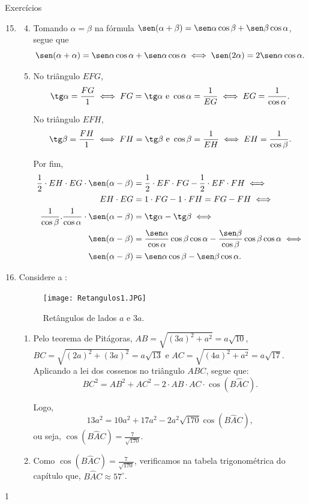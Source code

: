 \begin{answer}{Exercícios}
{\exerciselist
\begin{enumerate}[wide]\setcounter{enumi}{14}
\item 
\begin{enumerate}[wide]\setcounter{enumii}{3}
    \item{}
     Tomando $\alpha=\beta$ na fórmula $\sen(\alpha+\beta)=\sen\alpha\cos\beta+\sen\beta\cos\alpha$, segue que
     $$\sen(\alpha+\alpha)=\sen\alpha\cos\alpha+\sen\alpha\cos\alpha \iff \sen(2\alpha)=2\sen\alpha\cos\alpha.$$
     
     \item{}
     No triângulo $EFG$, 
     $$\tg\alpha=\frac{FG}{1} \iff FG=\tg\alpha \ \text{e} \ \cos\alpha=\frac{1}{EG} \iff EG=\frac{1}{\cos\alpha}.$$
     
     No triângulo $EFH$, 
     $$\tg\beta=\frac{FH}{1} \iff FH=\tg\beta \ \text{e} \ \cos\beta=\frac{1}{EH} \iff EH=\frac{1}{\cos\beta}.$$ 
     
     Por fim,
    \begin{align*}
     \frac{1}{2} \cdot EH \cdot EG \cdot \sen(\alpha-\beta)&=\frac{1}{2}\cdot EF\cdot FG-\frac{1}{2}\cdot EF\cdot FH \iff\\
     EH\cdot EG&=1\cdot FG-1\cdot FH=FG-FH  \iff\\
     \frac{1}{\cos\beta}.\frac{1}{\cos\alpha}\cdot\sen(\alpha-\beta)&=\tg\alpha-\tg\beta \iff\\
     \sen(\alpha-\beta)&=\frac{\sen\alpha}{\cos\alpha}\cos\beta\cos\alpha-\frac{\sen\beta}{\cos\beta}\cos\beta\cos\alpha\iff\\
     \sen(\alpha-\beta)&=\sen\alpha\cos\beta-\sen\beta\cos\alpha.
    \end{align*}
\end{enumerate}

\item Considere a :
     \begin{figure}[H]
    \centering
    \texttt{[image: Retangulos1.JPG]}
    \caption{Retângulos de lados $a$ e $3a$.}
    \label{retangulos1}
\end{figure}
\begin{enumerate}
    \item {}
     Pelo teorema de Pitágoras, $AB=\sqrt{(3a)^2+a^2}=a\sqrt{10}$, $BC=\sqrt{(2a)^2+(3a)^2}=a\sqrt{13}$ e $AC=\sqrt{(4a)^2+a^2}=a\sqrt{17}.$ Aplicando a lei dos cossenos no triângulo $ABC$, segue que:
    $$BC^2=AB^2+AC^2-2\cdot AB \cdot AC\cdot\cos(B\hat{A}C).$$
    
    Logo,  
    $$13a^2=10a^2+17a^2-2a^2\sqrt{170}\cos(B\hat{A}C),$$
    ou seja, $\cos(B\hat{A}C)=\frac{7}{\sqrt{170}}$.
    
    \item{}
    Como $\cos(B\hat{A}C)=\frac{7}{\sqrt{170}}$, verificamos na tabela trigonométrica do capítulo que, $B\hat{A}C\approx 57^\circ$.
\end{enumerate}
\end{enumerate}
}{1}
\end{answer}

